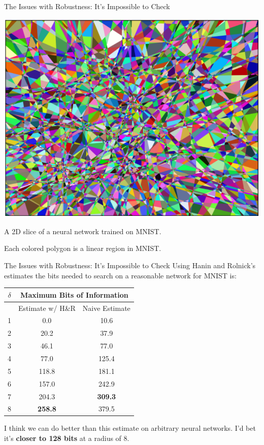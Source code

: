 \documentclass{beamer}
\begin{document}
\begin{frame}{The Issues with Robustness: It's Impossible to Check}
    \begin{center}
        \includegraphics[scale=0.23]{image_of_2d_regions_in_mnist.png}

        A 2D slice of a neural network trained on MNIST. 
        
        Each colored polygon is a linear region in MNIST. \cite{estimate_of_linear_regions}
    \end{center}
\end{frame}

\begin{frame}{The Issues with Robustness: It's Impossible to Check}
    Using Hanin and Rolnick's estimates the bits needed to search on a reasonable network for MNIST is:
    \begin{center}
        \begin{tabular}{| c || c | c |}
            \hline
            $\delta$ & \multicolumn{2}{|c|}{Maximum Bits of Information} \\
            \hline
            & Estimate w/ H\&R & Naive Estimate \\
            \hline
                1 & 0.0 & 10.6 \\
                2 & 20.2 & 37.9 \\
                3 & 46.1 & 77.0 \\
                4 & 77.0 & 125.4 \\
                5 & 118.8 & 181.1 \\
                6 & 157.0 & 242.9 \\
                7 & 204.3 & \textbf{309.3} \\
                8 & \textbf{258.8} & 379.5 \\
            \hline
        \end{tabular}
        \vspace{10pt}

        I think we can do better than this estimate on arbitrary neural networks. I'd bet it's \textbf{closer to 128 bits} at a radius of 8.
    \end{center}
\end{frame}
\end{document}
